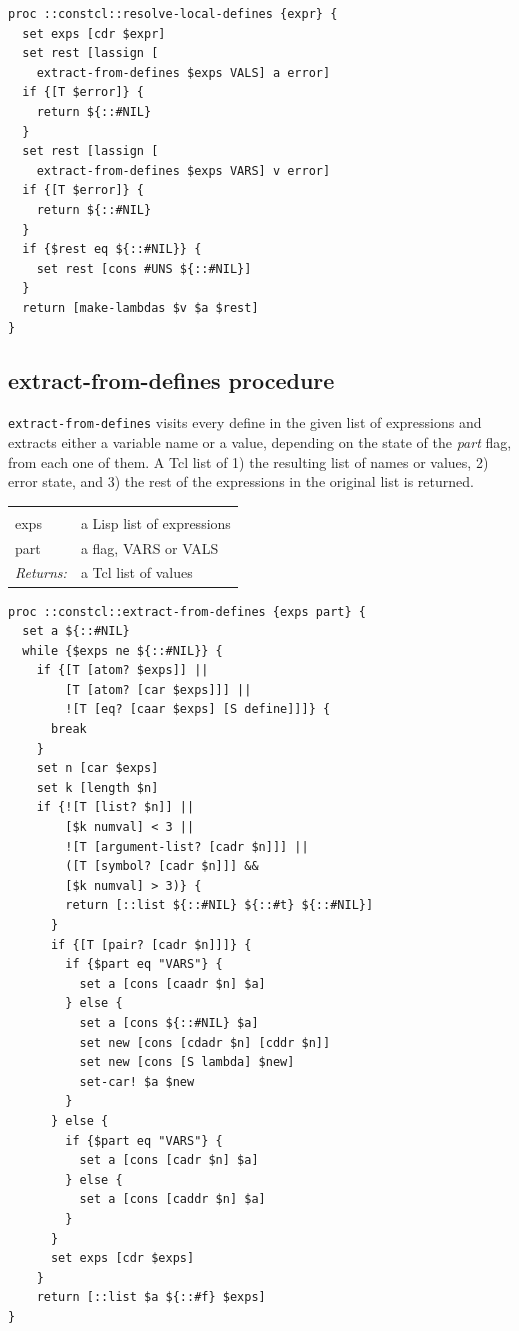\documentclass[twoside]{report}
\begin{document}
\begin{lstlisting}
proc ::constcl::resolve-local-defines {expr} {
  set exps [cdr $expr]
  set rest [lassign [
    extract-from-defines $exps VALS] a error]
  if {[T $error]} {
    return ${::#NIL}
  }
  set rest [lassign [
    extract-from-defines $exps VARS] v error]
  if {[T $error]} {
    return ${::#NIL}
  }
  if {$rest eq ${::#NIL}} {
    set rest [cons #UNS ${::#NIL}]
  }
  return [make-lambdas $v $a $rest]
}
\end{lstlisting}

\subsection{extract-from-defines procedure}
\label{extractfromdefines-procedure}

\texttt{extract-from-defines} visits every define in the given list of expressions and extracts either a variable name or a value, depending on the state of the \emph{part} flag, from each one of them. A Tcl list of 1) the resulting list of names or values, 2) error state, and 3) the rest of the expressions in the original list is returned.

\noindent\begin{tabular}{ |p{1.9cm} p{8cm}| }
\hline
\rowcolor[HTML]{CCCCCC} \multicolumn{2}{|l|}{\bf extract-from-defines (internal)} \\
exps & a Lisp list of expressions \\
part & a flag, VARS or VALS \\
\textit{Returns:} & a Tcl list of values \\
\hline
\end{tabular}

\begin{lstlisting}
proc ::constcl::extract-from-defines {exps part} {
  set a ${::#NIL}
  while {$exps ne ${::#NIL}} {
    if {[T [atom? $exps]] ||
        [T [atom? [car $exps]]] ||
        ![T [eq? [caar $exps] [S define]]]} {
      break
    }
    set n [car $exps]
    set k [length $n]
    if {![T [list? $n]] ||
        [$k numval] < 3 ||
        ![T [argument-list? [cadr $n]]] ||
        ([T [symbol? [cadr $n]]] &&
        [$k numval] > 3)} {
        return [::list ${::#NIL} ${::#t} ${::#NIL}]
      }
      if {[T [pair? [cadr $n]]]} {
        if {$part eq "VARS"} {
          set a [cons [caadr $n] $a]
        } else {
          set a [cons ${::#NIL} $a]
          set new [cons [cdadr $n] [cddr $n]]
          set new [cons [S lambda] $new]
          set-car! $a $new
        }
      } else {
        if {$part eq "VARS"} {
          set a [cons [cadr $n] $a]
        } else {
          set a [cons [caddr $n] $a]
        }
      }
      set exps [cdr $exps]
    }
    return [::list $a ${::#f} $exps]
}
\end{lstlisting}
\end{document}
